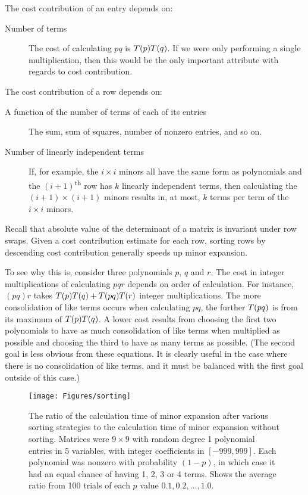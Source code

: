 \documentclass[12pt]{amsart}
\numberwithin{equation}{section}
\numberwithin{figure}{section}
\newcommand{\xth}{\textsuperscript{th}\xspace}
\newcommand{\cc}{cost contribution\xspace}
\newcommand{\lrparen}[2][1]{\ifthenelse{\equal{#1}{1}}{(#2)}{\left(#2\right)}}
\newcommand{\nterms}[2][1]{T\lrparen[#1]{#2}}
\begin{document}
The \cc of an entry depends on:
\begin{description}
\item[Number of terms] The cost of calculating $pq$ is $\nterms{p}\nterms{q}$. If we were only performing a single multiplication, then this would be the only important attribute with regards to \cc.
\begin{comment}
\item[Frequency of its variables in other rows and columns] When multiplying polynomials that share a variable, consolidation of like terms reduces the number of terms in the product, making subsequent multiplications less costly.
\end{comment}
\end{description}
The \cc of a row depends on:
\begin{description}
\item[A function of the number of terms of each of its entries] The sum, sum of squares, number of nonzero entries, and so on.
\item[Number of linearly independent terms] If, for example, the $i \times i$ minors all have the same form as polynomials and the $(i+1)$\xth row has $k$ linearly independent terms, then calculating the $(i+1) \times (i+1)$ minors results in, at most, $k$ terms per term of the $i \times i$ minors.
\end{description}

Recall that absolute value of the determinant of a matrix is invariant under row swaps. Given a \cc estimate for each row, sorting rows by descending \cc generally speeds up minor expansion.

To see why this is, consider three polynomials $p$, $q$ and $r$. The cost in integer multiplications of calculating $pqr$ depends on order of calculation. For instance, $(pq)r$ takes $\nterms{p}\nterms{q} + \nterms{pq}\nterms{r}$ integer multiplications. The more consolidation of like terms occurs when calculating $pq$, the further $\nterms{pq}$ is from its maximum of $\nterms{p}\nterms{q}$. A lower cost results from choosing the first two polynomials to have as much consolidation of like terms when multiplied as possible and choosing the third to have as many terms as possible. (The second goal is less obvious from these equations. It is clearly useful in the case where there is no consolidation of like terms, and it must be balanced with the first goal outside of this case.)

\begin{figure}[tb]
\texttt{[image: Figures/sorting]}
\vspace{-\baselineskip}
\caption{The ratio of the calculation time of minor expansion after various sorting strategies to the calculation time of minor expansion without sorting. Matrices were $9 \times 9$ with random degree 1 polynomial entries in 5 variables, with integer coefficients in $[-999,999]$. Each polynomial was nonzero with probability $(1-p)$, in which case it had an equal chance of having 1, 2, 3 or 4 terms. Shows the average ratio from 100 trials of each $p$ value $0.1, 0.2, \dots, 1.0$.}
\label{sorting1}
\end{figure}
\end{document}

